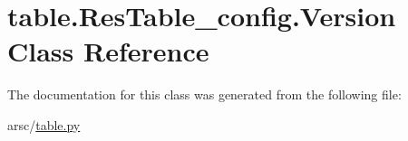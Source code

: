 \hypertarget{classtable_1_1ResTable__config_1_1Version}{}\section{table.\+Res\+Table\+\_\+config.\+Version Class Reference}
\label{classtable_1_1ResTable__config_1_1Version}


The documentation for this class was generated from the following file\+:\begin{DoxyCompactItemize}
\item 
arsc/\mbox{\hyperlink{table_8py}{table.\+py}}\end{DoxyCompactItemize}
